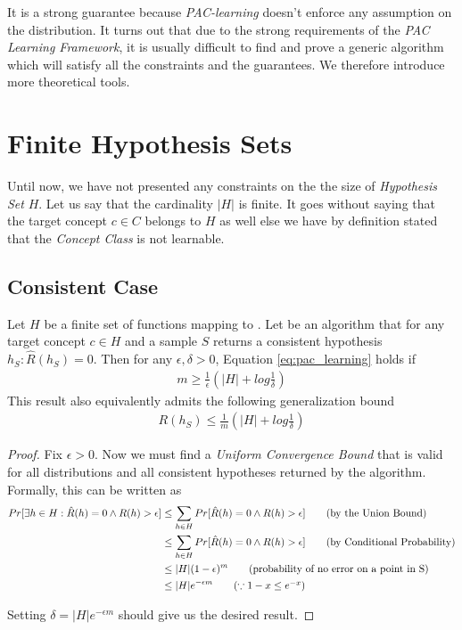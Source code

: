 \documentclass[../main]{subfiles}
\begin{document}
It is a strong guarantee because \textit{PAC-learning} doesn't enforce any assumption
on the distribution. It turns out that due to the strong requirements of the \textit{PAC 
Learning Framework}, it is usually difficult to find and prove a generic algorithm 
 which will satisfy all the constraints and the guarantees. We therefore
introduce more theoretical tools.

\section{Finite Hypothesis Sets}

Until now, we have not presented any constraints on the the size of \textit{Hypothesis
Set} $H$. Let us say that the cardinality $|H|$ is finite. It goes without saying that the
target concept $c \in C$ belongs to $H$ as well else we have by definition stated that 
the \textit{Concept Class} is not learnable.

\subsection{Consistent Case}

\begin{theorem}
Let $H$ be a finite set of functions mapping  to . Let 
be an algorithm that for any target concept $c \in H$ and a sample $S$ returns a
consistent hypothesis $h_S: \hat{R}(h_S) = 0$. Then for any $\epsilon, \delta > 0$,
Equation \ref{eq:pac_learning} holds if
\begin{align}
m \geq \frac{1}{\epsilon} \left( |H| + log\frac{1}{\delta}\right) \label{th:fh_consistent_1}
\end{align}
This result also equivalently admits the following generalization bound
\begin{align}
R(h_S) \leq \frac{1}{m} \left( |H| + log\frac{1}{\delta}\right) \label{th:fh_consistent_2}
\end{align}
\end{theorem}

\begin{proof}
Fix $\epsilon > 0$. Now we must find a \textit{Uniform Convergence Bound} that is
valid for all distributions and all consistent hypotheses returned by the algorithm.
Formally, this can be written as
\begin{align}
Pr[\exists h \in H: \hat{R}(h) = 0 \land R(h) > \epsilon] &\leq \sum_{h \in H} Pr[\hat{R}(h) = 0 \land R(h) > \epsilon] \tag{by the Union Bound} \\
&\leq \sum_{h \in H} Pr[\hat{R}(h) = 0 \land R(h) > \epsilon] \tag{by Conditional Probability} \\
&\leq |H| (1-\epsilon)^m \tag{probability of no error on a point in S} \\
&\leq |H| e^{-\epsilon m} \tag{$\because 1-x\leq e^{-x}$}
\end{align}

Setting $\delta = |H| e^{-\epsilon m}$ should give us the desired result.
\end{proof}
\end{document}
